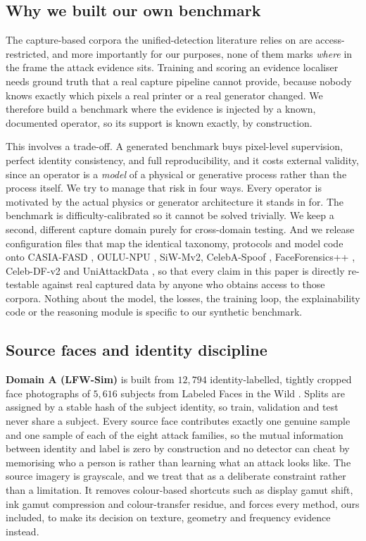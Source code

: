 \documentclass[conference]{IEEEtran}
\begin{document}
\subsection{Why we built our own benchmark}
The capture-based corpora the unified-detection literature relies on
\cite{yu2024unified,ma2025uniattackplus} are access-restricted, and more
importantly for our purposes, none of them marks \emph{where} in the frame the
attack evidence sits. Training and scoring an evidence localiser needs
ground truth that a real capture pipeline cannot provide, because nobody
knows exactly which pixels a real printer or a real generator changed. We therefore
build a benchmark where the evidence is injected by a known, documented operator, so
its support is known exactly, by construction.

This involves a trade-off. A generated benchmark buys
pixel-level supervision, perfect identity consistency, and full reproducibility, and
it costs external validity, since an operator is a \emph{model} of a physical or
generative process rather than the process itself. We try to manage that risk in
four ways. Every operator is motivated by the actual physics or generator
architecture it stands in for. The benchmark is difficulty-calibrated so it cannot
be solved trivially. We keep a second, different capture domain purely
for cross-domain testing. And we release configuration files that map the identical
taxonomy, protocols and model code onto CASIA-FASD \cite{zhang2012casia}, OULU-NPU
\cite{boulkenafet2017oulu}, SiW-Mv2, CelebA-Spoof \cite{zhang2020celebaspoof},
FaceForensics++ \cite{rossler2019ff}, Celeb-DF-v2 \cite{li2020celebdf} and
UniAttackData \cite{yu2024unified}, so that every claim in this paper is directly
re-testable against real captured data by anyone who obtains access to those
corpora. Nothing about the model, the losses, the training loop, the
explainability code or the reasoning module is specific to our synthetic benchmark.

\subsection{Source faces and identity discipline}
\textbf{Domain A (LFW-Sim)} is built from $12{,}794$ identity-labelled, tightly
cropped face photographs of $5{,}616$ subjects from Labeled Faces in the Wild
\cite{huang2007lfw}. Splits are assigned by a stable hash of the subject identity,
so train, validation and test never share a subject. Every source face contributes
exactly one genuine sample and one sample of each of the eight attack families, so
the mutual information between identity and label is zero by construction and no
detector can cheat by memorising who a person is rather than learning what an attack
looks like. The source imagery is grayscale, and we treat that as a deliberate
constraint rather than a limitation. It removes colour-based shortcuts such as
display gamut shift, ink gamut compression and colour-transfer residue, and forces
every method, ours included, to make its decision on texture, geometry and frequency
evidence instead.
\end{document}

